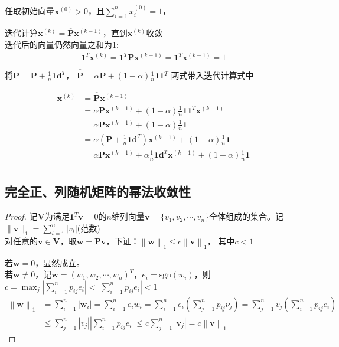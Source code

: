\documentclass[10t, a4paper, oneside]{ctexbook}
\begin{document}
任取初始向量$\mathbf{x}^{(0)}>0$，且$\sum\limits_{i=1}^nx_i^{(0)}=1$，

迭代计算$\mathbf{x}^{(k)}=\overline{\overline{\mathbf{P}}}\mathbf{x}^{(k-1)}$，直到$\mathbf{x}^{(k)}$收敛\\
迭代后的向量仍然向量之和为1:
$$\mathbf{1}^T\mathbf{x}^{(k)}=\mathbf{1}^T\overline{\overline{\mathbf{P}}}\mathbf{x}^{(k-1)}=\mathbf{1}^T\mathbf{x}^{(k-1)}=1$$

将$\overline{\mathbf{P}}=\mathbf{P}+\frac{1}{n}\mathbf{1}\mathbf{d}^T$， $\overline{\overline{\mathbf{P}}}=\alpha\overline{\mathbf{P}}+(1-\alpha)\frac{1}{n}\mathbf{1}\mathbf{1}^T$
两式带入迭代计算式中

$$\begin{aligned}
    \mathbf{x}^{(k)}&=\overline{\overline{\mathbf{P}}}\mathbf{x}^{(k-1)}\\
    &=\alpha\overline{\mathbf{P}}\mathbf{x}^{(k-1)}+(1-\alpha)\frac{1}{n}\mathbf{1}\mathbf{1}^T\mathbf{x}^{(k-1)}\\
    &=\alpha\overline{\mathbf{P}}\mathbf{x}^{(k-1)}+(1-\alpha)\frac{1}{n}\mathbf{1}\\
    &=\alpha(\mathbf{P}+\frac{1}{n}\mathbf{1}\mathbf{d}^T)\mathbf{x}^{(k-1)}+(1-\alpha)\frac{1}{n}\mathbf{1}\\
    &=\alpha\mathbf{P}\mathbf{x}^{(k-1)}+\alpha\frac{1}{n}\mathbf{1}\mathbf{d}^T\mathbf{x}^{(k-1)}+(1-\alpha)\frac{1}{n}\mathbf{1}\\
\end{aligned}$$

\subsection{完全正、列随机矩阵的幂法收敛性}
\begin{proof}
    记$\mathbf{V}$为满足$\mathbf{1}^T\mathbf{v}= 0 $的$n$维列向量$\mathbf{v}=\{v_1,v_2,\cdots,v_n\}$全体组成的集合。记$\|\mathbf{v}\|_1=\sum\limits_{i=1}^n|v_i|$(范数)\\
    对任意的$\mathbf{v}\in\mathbf{V}$，取$\mathbf{w}=\mathbf{P}\mathbf{v}$，下证：$\left\|\mathbf{w}\right\|_1\leq c\left\|\mathbf{v}\right\|_1$， 其中$c<1$

    \noindent 若$\mathbf{w}=0$，显然成立。\\
    若$\mathbf{w}\neq0$，记$\mathbf{w}=(w_1,w_2,\cdots,w_n)^T$，$e_i = \text{sgn}(w_i)$，则 $c=\max_{j}\left|\sum_{i=1}^{n}p_{ij}e_{i}\right|<\left|\sum_{i=1}^np_{ij}e_{i}\right|<1$ 
    $$\begin{aligned}
        \left\|\mathbf{w}\right\|_1
        &=\sum_{i=1}^n\left|\mathbf{w}_i\right|=\sum_{i=1}^ne_iw_i=\sum_{i=1}^ne_i\left(\sum_{j=1}^np_{ij}\nu_j\right)=\sum_{j=1}^nv_j\left(\sum_{i=1}^np_{ij}e_i\right)\\
        &\leq\sum_{j=1}^n\left|v_j\right|\left|\sum_{i=1}^np_{ij}e_i\right|\leq c\sum_{j=1}^n\left|\mathbf{v}_j\right|=c\left\|\mathbf{v}\right\|_1
    \end{aligned}$$
\end{proof}
\end{document}
